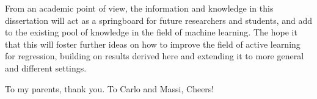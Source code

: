 \begin{impactstatement}
From an academic point of view, the information and knowledge in this
dissertation will act as a springboard for future researchers and students, and
add to the existing pool of knowledge in the field of machine learning. The hope
it that this will foster further ideas on how to improve the field of active
learning for regression, building on results derived here and extending it to
more general and different settings.
\end{impactstatement}

\begin{acknowledgements}
  To my parents, thank you.
  \newline
  \newline
  To Carlo and Massi, Cheers!
\end{acknowledgements}

\setcounter{tocdepth}{2} 

\tableofcontents
\listoffigures
\listoftables

